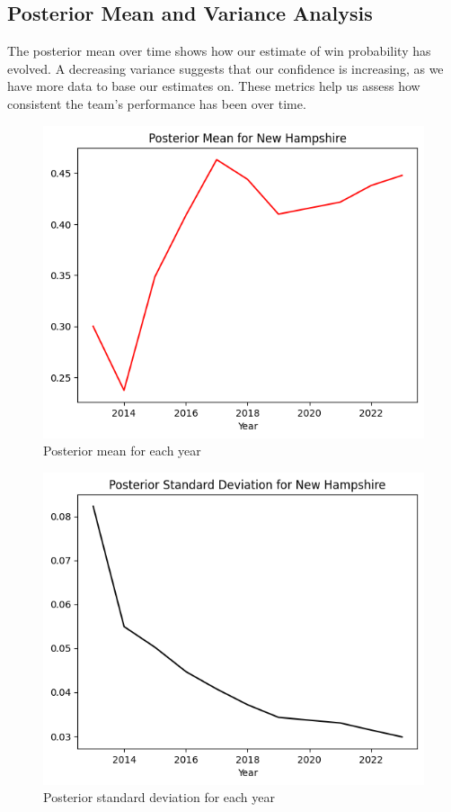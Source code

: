 \subsection{Posterior Mean and Variance Analysis}

The posterior mean over time shows how our estimate of win probability has evolved.
A decreasing variance suggests that our confidence is increasing, as we have more data to base our estimates on.
These metrics help us assess how consistent the team’s performance has been over time.

\begin{figure}[!ht]
  \centering
  \includegraphics[width=.5\textwidth]{Project1/Report/images/posterior-mean.png}
  \caption{Posterior mean for each year}
\end{figure}

\begin{figure}[!ht]
  \centering
  \includegraphics[width=.5\textwidth]{Project1/Report/images/posterior-sd.png}
  \caption{Posterior standard deviation for each year}
\end{figure}
